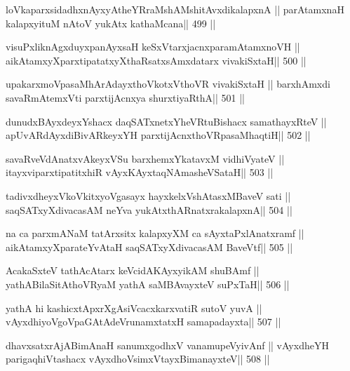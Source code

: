 \begin{shl}
loVkaparxsidadhxnAyxyAtheYRraMshAMshitAvxdikalapxnA ||
parAtamxnaH kalapxyituM nAtoV yukAtx kathaMcana\hfill || 499 ||
\end{shl}

\begin{shl}
visuPxliknAgxduyxpanAyxsaH keSxVtarxjacnxparamAtamxnoVH ||
aikAtamxyXparxtipatatxyXthaRsatxsAmxdatarx vivakiSxtaH\hfill || 500 ||
\end{shl}

\begin{shl}
upakarxmoVpasaMhArAdayxthoVkotxV\s thoVR vivakiSxtaH ||
barxhAmxdi savaRmAtemxVti parxtijAcnxya shurxtiyaRthA\hfill || 501 ||
\end{shl}

\begin{shl}
dunudxBAyxdeyxYshacx daqSATxnetxYheVRtuBishacx samathayxRteV ||
apUvARdAyxdiBivARkeyxYH parxtijAcnxthoVRpasaMhaqtiH\hfill || 502 ||
\end{shl}

\begin{shl}
savaRveVdAnatxvAkeyxVSu barxhemxYkatavxM vidhiVyateV ||
itayxviparxtipatitxhiR vAyxKAyxtaqNAmasheVSataH\hfill || 503 ||
\end{shl}

\begin{shl}
tadivxdheyxVkoVkitxyoVgasayx hayxkelxVshAtasxMBaveV sati ||
saqSATxyXdivacasAM neYva yukAtx\s thARnatxrakalapxnA\hfill || 504 ||
\end{shl}

\begin{shl}
na ca parxmANaM tatArxsitx kalapxyXM ca sAyxtaPxlAnatxramf ||
aikAtamxyXparateYvAtaH saqSATxyXdivacasAM BaveVtf\hfill || 505 ||
\end{shl}

\begin{shl}
AcakaSxteV tathAcAtarx keVcidAKAyxyikAM shuBAmf ||
yathABilaSitAthoVR\s yaM yathA saMBAvayxteV suPxTaH\hfill || 506 ||
\end{shl}

\begin{shl}
yathA hi kashicxtApxrXgAsiVcacxkarxvatiR sutoV yuvA ||
vAyxdhiyoVgoVpaGAtAdeVrunamxtatxH samapadayxta\hfill || 507 ||
\end{shl}

\begin{shl}
dhavxsatxrAjABimAnaH sanumxgodhxV vanamupeVyivAnf ||
vAyxdheYH parigaqhiVtashacx vAyxdhoV\s simxVtayxBimanayxteV\hfill || 508 ||
\end{shl}

